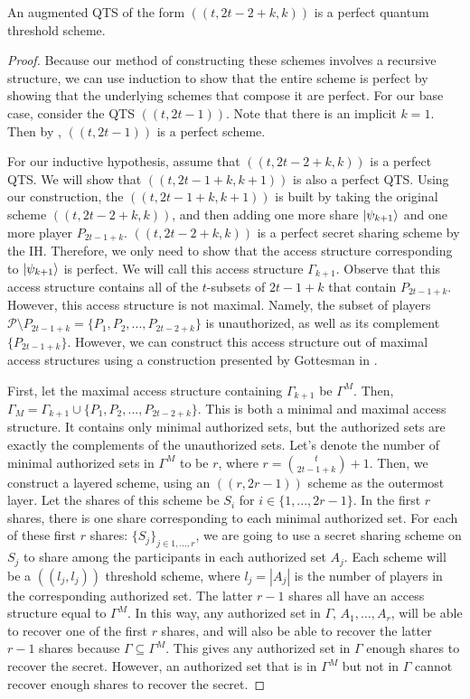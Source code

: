 \begin{theorem}
    An augmented QTS of the form $((t,2t-2+k,k))$ is a perfect quantum threshold scheme.
\end{theorem}

\begin{proof}
    Because our method of constructing these schemes involves a recursive structure, we can use induction to show that the entire scheme is perfect by showing that the underlying schemes that compose it are perfect. For our base case, consider the QTS $((t,2t-1))$. Note that there is an implicit $k=1$. Then by , $((t,2t-1))$ is a perfect scheme.
    
    For our inductive hypothesis, assume that $((t,2t-2+k,k))$ is a perfect QTS. We will show that $((t,2t-1+k,k+1))$ is also a perfect QTS. Using our construction, the $((t,2t-1+k,k+1))$ is built by taking the original scheme $((t,2t-2+k,k))$, and then adding one more share $\ket{\psi_{k+1}}$ and one more player $P_{2t-1+k}$. $((t,2t-2+k,k))$ is a perfect secret sharing scheme by the IH. Therefore, we only need to show that the access structure corresponding to $\ket{\psi_{k+1}}$ is perfect. We will call this access structure $\Gamma_{k+1}$. Observe that this access structure contains all of the $t$-subsets of $2t-1+k$ that contain $P_{2t-1+k}$. However, this access structure is not maximal. Namely, the subset of players $\mathcal{P} \setminus P_{2t-1+k} = \{P_1,P_2,...,P_{2t-2+k}\}$ is unauthorized, as well as its complement $\{P_{2t-1+k}\}$. However, we can construct this access structure out of maximal access structures using a construction presented by Gottesman in \cite{gottesman_theory_2000}.
    
    First, let the maximal access structure containing $\Gamma_{k+1}$ be $\Gamma^M$. Then, $\Gamma_M = \Gamma_{k+1} \cup \{P_1,P_2,...,P_{2t-2+k}\}$. This is both a minimal and maximal access structure. It contains only minimal authorized sets, but the authorized sets are exactly the complements of the unauthorized sets. Let's denote the number of minimal authorized sets in $\Gamma^M$ to be $r$, where $r = \binom{t}{2t-1+k} + 1$. Then, we construct a layered scheme, using an $((r,2r-1))$ scheme as the outermost layer. Let the shares of this scheme be $S_i$ for $i \in \{1,...,2r-1\}$. In the first $r$ shares, there is one share corresponding to each minimal authorized set. For each of these first $r$ shares: $\{S_j\}_{j\in 1,...,r}$, we are going to use a secret sharing scheme on $S_j$ to share among the participants in each authorized set $A_j$. Each scheme will be a $((l_j,l_j))$ threshold scheme, where $l_j = |A_j|$ is the number of players in the corresponding authorized set. The latter $r-1$ shares all have an access structure equal to $\Gamma^M$. In this way, any authorized set in $\Gamma$, $A_1,\dots,A_r$, will be able to recover one of the first $r$ shares, and will also be able to recover the latter $r-1$ shares because $\Gamma \subseteq \Gamma^M$. This gives any authorized set in $\Gamma$ enough shares to recover the secret. However, an authorized set that is in $\Gamma^M$ but not in $\Gamma$ cannot recover enough shares to recover the secret. 
    

\end{proof}
